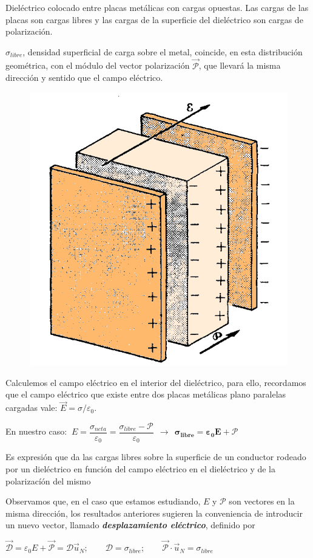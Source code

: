 \begin{multicols}{2}
	Dieléctrico colocado entre placas metálicas con cargas opuestas. Las cargas de las placas son cargas libres y las cargas de la superficie del dieléctrico son cargas de polarización.

$\sigma_{libre}$, densidad superficial de carga sobre el metal, coincide, en esta distribución geométrica, con el módulo del vector polarización $\vec {\mathcal P}$, que llevará la misma dirección y sentido que el campo eléctrico.
\begin{figure}[H]
	\centering
	\includegraphics[width=.5\textwidth]{imagenes/imagenes24/T24IM10.png}
\end{figure}
\end{multicols}

Calculemos el campo eléctrico en el interior del dieléctrico, para ello, recordamos que el campo eléctrico que existe entre dos placas metálicas plano paralelas cargadas vale: $\vec E=\sigma / \varepsilon_0$.

En nuestro caso: $\ E=\dfrac{\sigma_{neta}}{\varepsilon_0}=\dfrac{\sigma_{libre}- \mathcal P}{\varepsilon_0} \ \ \to \ \  \boldsymbol{ \sigma_{libre}=\varepsilon_0 E + \mathcal P }$

Es expresión que da las cargas libres sobre la superficie de un conductor rodeado por un dieléctrico en función del campo eléctrico en el dieléctrico y de la polarizacíón del mismo

Observamos que, en el caso que estamos estudiando, $E$ y $\mathcal P$ son vectores en la misma dirección, los resultados anteriores sugieren la conveniencia de introducir un nuevo vector, llamado \emph{\textbf{desplazamiento eléctrico}}, definido por

$\vec{\mathcal D}=\varepsilon_0 E + \vec{\mathcal P}=\mathcal D \vec u_N;\qquad \mathcal D=\sigma_{libre};\qquad \vec {\mathcal P} \cdot \vec u_N=\sigma_{libre}$

